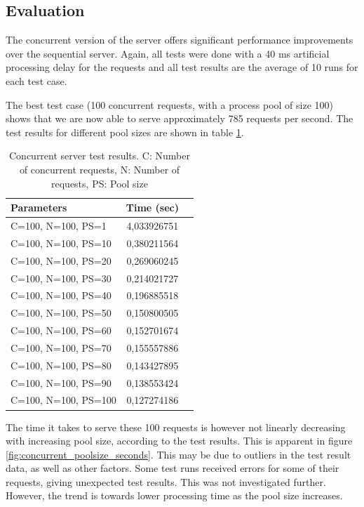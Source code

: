 \documentclass[a4paper, 11pt]{article}
\begin{document}
\subsection{Evaluation}

The concurrent version of the server offers significant performance improvements over the sequential server. Again, all tests were done with a 40 ms artificial processing delay for the requests and all test results are the average of 10 runs for each test case.

The best test case (100 concurrent requests, with a process pool of size 100) shows that we are now able to serve approximately 785 requests per second. The test results for different pool sizes are shown in table \ref{tab:concurrent_results}.

\begin{table}[h]
\centering
\begin{tabular}{lcc}
Parameters & Time (sec)\\\hline
C=100, N=100, PS=1 & 4,033926751\\\hline
C=100, N=100, PS=10 & 0,380211564\\\hline
C=100, N=100, PS=20 & 0,269060245\\\hline
C=100, N=100, PS=30 & 0,214021727\\\hline
C=100, N=100, PS=40 & 0,196885518\\\hline
C=100, N=100, PS=50 & 0,150800505\\\hline
C=100, N=100, PS=60 & 0,152701674\\\hline
C=100, N=100, PS=70 & 0,155557886\\\hline
C=100, N=100, PS=80 & 0,143427895\\\hline
C=100, N=100, PS=90 & 0,138553424\\\hline
C=100, N=100, PS=100 & 0,127274186\\\hline
\end{tabular}
\caption{Concurrent server test results. C: Number of concurrent requests, N: Number of requests, PS: Pool size}
\label{tab:concurrent_results}
\end{table}

The time it takes to serve these 100 requests is however not linearly decreasing with increasing pool size, according to the test results. This is apparent in figure \ref{fig:concurrent_poolsize_seconds}. This may be due to outliers in the test result data, as well as other factors. Some test runs received errors for some of their requests, giving unexpected test results. This was not investigated further. However, the trend is towards lower processing time as the pool size increases.
\end{document}
